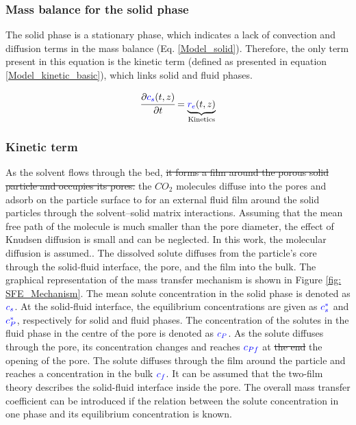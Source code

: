 \documentclass[../Parameter_fitting.tex]{subfiles}
\begin{document}
	\subsubsection{Mass balance for the solid phase} \label{Mass_balance_solid}
	The solid phase is a stationary phase, which indicates a lack of convection and diffusion terms in the mass balance (Eq.  \ref{Model_solid}). Therefore, the only term present in this equation is the kinetic term (defined as presented in equation \ref{Model_kinetic_basic}), which links solid and fluid phases.
	
	{\footnotesize
		\begin{equation} 
			\label{Model_solid}
					\cfrac{\partial {\color{blue}c_s}(t,z)}{\partial t} = \underbrace{ {\color{blue}r_e}(t,z) }_{\text{Kinetics}}
			\end{equation} }
			
			\subsubsection{Kinetic term} \label{CH: Kinetic}
			As the solvent flows through the bed, \sout{it forms a film around the porous solid particle and occupies its pores.} {\color{blue}the $CO_2$ molecules diffuse into the pores and adsorb on the particle surface to for an external fluid film around the solid particles through the solvent–solid matrix interactions. Assuming that the mean free path of the molecule is much smaller than the pore diameter, the effect of Knudsen diffusion is small and can be neglected. In this work, the molecular diffusion is assumed.}. The dissolved solute diffuses from the particle's core through the solid-fluid interface, the pore, and the film into the bulk. The graphical representation of the mass transfer mechanism is shown in Figure \ref{fig: SFE_Mechanism}. The mean solute concentration in the solid phase is denoted as ${\color{blue}c_s}$. At the solid-fluid interface, the equilibrium concentrations are given as ${\color{blue}c_s^*}$ and ${\color{blue}c_P^*}$, respectively for solid and fluid phases. The concentration of the solutes in the fluid phase in the centre of the pore is denoted as ${\color{blue}c_{P}}$. As the solute diffuses through the pore, its concentration changes and reaches ${\color{blue}c_{Pf}}$ at \sout{the end} {\color{blue}the opening} of the pore. The solute diffuses through the film around the particle and reaches a concentration in the bulk ${\color{blue}c_f}$. It can be assumed that the two-film theory describes the solid-fluid interface inside the pore. The overall mass transfer coefficient can be introduced if the relation between the solute concentration in one phase and its equilibrium concentration is known.
			
\end{document}
